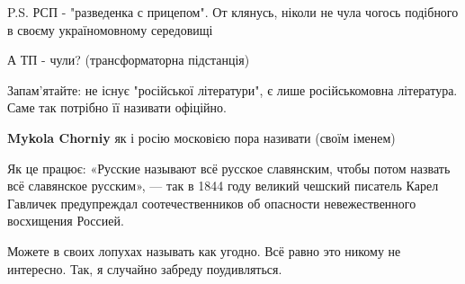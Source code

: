 \begin{itemize}
P.S. РСП - "разведенка с прицепом". От клянусь, ніколи не чула чогось подібного
в своєму україномовному середовищі

\begin{itemize}
 
А ТП - чули?
(трансформаторна підстанція)
\end{itemize}

 
Запам'ятайте: не існує "російської літератури", є лише російськомовна
література. Саме так потрібно її називати офіційно.

\begin{itemize}
 
\textbf{Mykola Chorniy} як і росію московією пора називати (своїм іменем)

 
Як це працює:
«Русские называют всё русское славянским, чтобы потом назвать всё славянское русским», — так в 1844 году великий чешский писатель Карел Гавличек предупреждал соотечественников об опасности невежественного восхищения Россией.

 
Можете в своих лопухах называть как угодно. Всё равно это никому не интересно. Так, я случайно забреду поудивляться.


\end{itemize}
\end{itemize}
